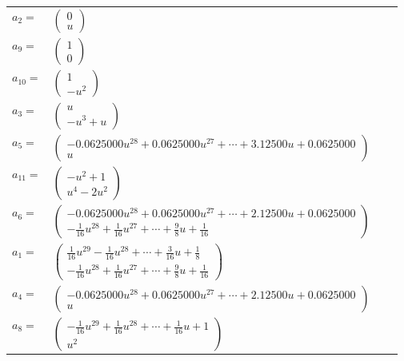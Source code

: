 \documentclass[1p]{elsarticle_modified}
\theoremstyle{definition}
\begin{document}
\begin{tabular}{m{7pt} m{180pt} m{7pt} m{180pt} }
\flushright $a_{2}=$&$\begin{pmatrix}0\\u\end{pmatrix}$ \\
\flushright $a_{9}=$&$\begin{pmatrix}1\\0\end{pmatrix}$ \\
\flushright $a_{10}=$&$\begin{pmatrix}1\\- u^2\end{pmatrix}$ \\
\flushright $a_{3}=$&$\begin{pmatrix}u\\- u^3+u\end{pmatrix}$ \\
\flushright $a_{5}=$&$\begin{pmatrix}-0.0625000 u^{28}+0.0625000 u^{27}+\cdots+3.12500 u+0.0625000\\u\end{pmatrix}$ \\
\flushright $a_{11}=$&$\begin{pmatrix}- u^2+1\\u^4-2 u^2\end{pmatrix}$ \\
\flushright $a_{6}=$&$\begin{pmatrix}-0.0625000 u^{28}+0.0625000 u^{27}+\cdots+2.12500 u+0.0625000\\-\frac{1}{16} u^{28}+\frac{1}{16} u^{27}+\cdots+\frac{9}{8} u+\frac{1}{16}\end{pmatrix}$ \\
\flushright $a_{1}=$&$\begin{pmatrix}\frac{1}{16} u^{29}-\frac{1}{16} u^{28}+\cdots+\frac{3}{16} u+\frac{1}{8}\\-\frac{1}{16} u^{28}+\frac{1}{16} u^{27}+\cdots+\frac{9}{8} u+\frac{1}{16}\end{pmatrix}$ \\
\flushright $a_{4}=$&$\begin{pmatrix}-0.0625000 u^{28}+0.0625000 u^{27}+\cdots+2.12500 u+0.0625000\\u\end{pmatrix}$ \\
\flushright $a_{8}=$&$\begin{pmatrix}-\frac{1}{16} u^{29}+\frac{1}{16} u^{28}+\cdots+\frac{1}{16} u+1\\u^2\end{pmatrix}$ \\

\end{tabular}
\end{document}
